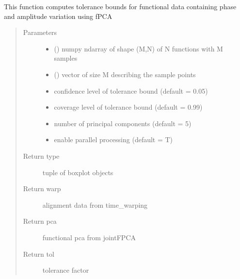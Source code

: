 \documentclass[letterpaper,10pt,english]{sphinxmanual}
\begin{document}
\begin{fulllineitems}
\label{\detokenize{tolerance:tolerance.pcaTB}}
This function computes tolerance bounds for functional data containing
phase and amplitude variation using fPCA
\begin{quote}\begin{description}
\item[{Parameters}] \leavevmode\begin{itemize}
\item {} 
 () \textendash{} numpy ndarray of shape (M,N) of N functions with M samples

\item {} 
 () \textendash{} vector of size M describing the sample points

\item {} 
 \textendash{} confidence level of tolerance bound (default = 0.05)

\item {} 
 \textendash{} coverage level of tolerance bound (default = 0.99)

\item {} 
 \textendash{} number of principal components (default = 5)

\item {} 
 \textendash{} enable parallel processing (default = T)

\end{itemize}

\item[{Return type}] \leavevmode
tuple of boxplot objects

\item[{Return warp}] \leavevmode
alignment data from time\_warping

\item[{Return pca}] \leavevmode
functional pca from jointFPCA

\item[{Return tol}] \leavevmode
tolerance factor

\end{description}\end{quote}

\end{fulllineitems}
\end{document}

